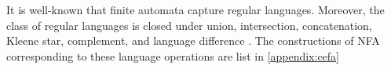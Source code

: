 It is well-known that finite automata capture regular languages. 
Moreover, the class of regular languages is closed under union, intersection, concatenation, Kleene star, complement, and language difference \cite{HU79}. The constructions of NFA corresponding to these language operations are list in \ref{appendix:cefa}

